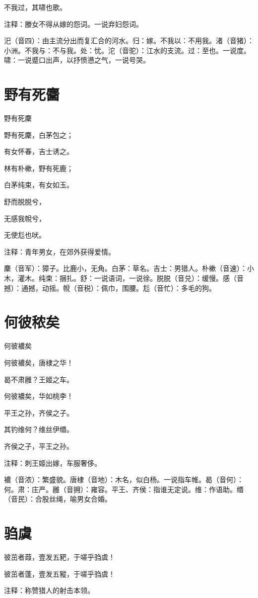 \documentclass[12pt,UTF8]{ctexbook}
\begin{document}
不我过，其啸也歌。

注释：媵女不得从嫁的怨词。一说弃妇怨词。

汜（音四）：由主流分出而复汇合的河水。归：嫁。不我以：不用我。渚（音猪）：小洲。不我与：不与我。处：忧。沱（音驼）：江水的支流。过：至也。一说度。啸：一说蹙口出声，以抒愤懑之气，一说号哭。
\chapter{野有死麕}

野有死麇

野有死麇，白茅包之；

有女怀春，吉士诱之。

林有朴樕，野有死鹿；

白茅纯束，有女如玉。

舒而脱脱兮，

无感我帨兮，

无使尨也吠。

注释：青年男女，在郊外获得爱情。

麇（音军）：獐子。比鹿小，无角。白茅：草名。吉士：男猎人。朴樕（音速）：小木，灌木。纯束：捆扎。舒：一说语词，一说徐。脱脱（音兑）：缓慢。感（音撼）：通撼，动摇。帨（音税）：佩巾，围腰。尨（音忙）：多毛的狗。

\chapter{何彼秾矣}
何彼襛矣 

何彼襛矣，唐棣之华！

曷不肃雝？王姬之车。

何彼襛矣，华如桃李！

平王之孙，齐侯之子。

其钓维何？维丝伊缗。

齐侯之子，平王之孙。

注释：刺王姬出嫁，车服奢侈。

襛（音浓）：繁盛貌。唐棣（音地）：木名，似白杨。一说指车帷。曷（音何）：何。肃：庄严。雝（音拥）：雍容。平王、齐侯：指谁无定说。维：作语助。缗（音民）：合股丝绳，喻男女合婚。

\chapter{驺虞}


彼茁者葭，壹发五豝，于嗟乎驺虞！

彼茁者蓬，壹发五豵，于嗟乎驺虞！

注释：称赞猎人的射击本领。
\end{document}
